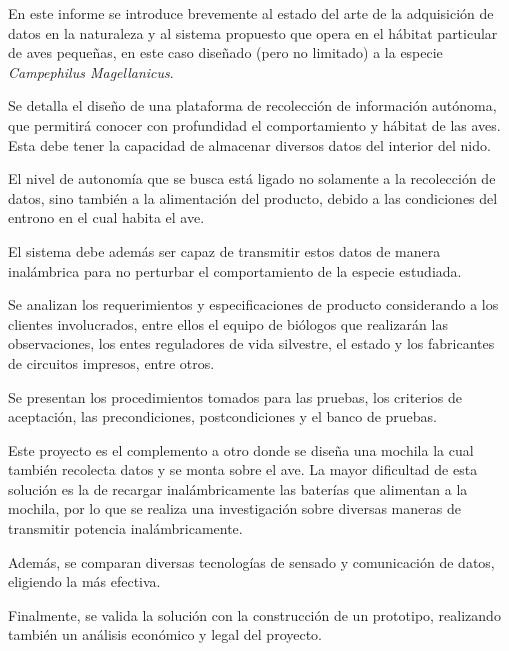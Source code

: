 %

%

En este informe se introduce brevemente al estado del arte de la adquisición de datos en la naturaleza y al sistema propuesto que opera en el hábitat particular de aves pequeñas, en este caso diseñado (pero no limitado) a la especie \textit{Campephilus Magellanicus}. 

Se detalla el diseño de una plataforma de recolección de información autónoma, que permitirá conocer con profundidad el comportamiento y hábitat de las aves. Esta debe tener la capacidad de almacenar diversos datos del interior del nido.%

El nivel de autonomía que se busca está ligado no solamente a la recolección de datos, sino también a la alimentación del producto, debido a las condiciones del entrono en el cual habita el ave. 

El sistema debe además ser capaz de transmitir estos datos de manera inalámbrica para no perturbar el comportamiento de la especie estudiada.

Se analizan los requerimientos y especificaciones de producto considerando a los clientes involucrados, entre ellos el equipo de biólogos que realizarán las observaciones, los entes reguladores de vida silvestre, el estado y los fabricantes de circuitos impresos, entre otros.

Se presentan los procedimientos tomados para las pruebas, los criterios de aceptación, las precondiciones, postcondiciones y el banco de pruebas.

Este proyecto es el complemento a otro donde se diseña una mochila la cual también recolecta datos y se monta sobre el ave. La mayor dificultad de esta solución es la de recargar inalámbricamente las baterías que alimentan a la mochila, por lo que se realiza una investigación sobre diversas maneras de transmitir potencia inalámbricamente.

Además, se comparan diversas tecnologías de sensado y comunicación de datos, eligiendo la más efectiva.

Finalmente, se valida la solución con la construcción de un prototipo, realizando también un análisis económico y legal del proyecto.


